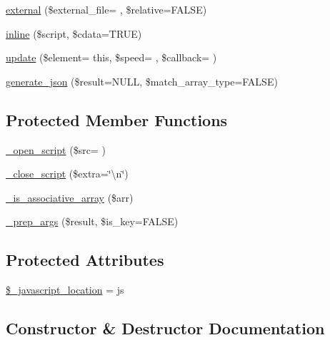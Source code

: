 \begin{DoxyCompactItemize}
\item 
\hyperlink{class_c_i___javascript_a3466ab14e2cea4f7d82050e789c2b453}{external} (\$external\+\_\+file= \textquotesingle{}\textquotesingle{}, \$relative=F\+A\+L\+S\+E)
\item 
\hyperlink{class_c_i___javascript_aeecd5d85370a4037c00dba82960816e1}{inline} (\$script, \$cdata=T\+R\+U\+E)
\item 
\hyperlink{class_c_i___javascript_af6625c6fef0852c0e89db2cef6a21d29}{update} (\$element= \textquotesingle{}this\textquotesingle{}, \$speed= \textquotesingle{}\textquotesingle{}, \$callback= \textquotesingle{}\textquotesingle{})
\item 
\hyperlink{class_c_i___javascript_ae60bb50a1e4cbbce1f6c29a73fad5e07}{generate\+\_\+json} (\$result=N\+U\+L\+L, \$match\+\_\+array\+\_\+type=F\+A\+L\+S\+E)
\end{DoxyCompactItemize}
\subsection*{Protected Member Functions}
\begin{DoxyCompactItemize}
\item 
\hyperlink{class_c_i___javascript_a85bfd18764ef4d0fdbbb3443c89c58ae}{\+\_\+open\+\_\+script} (\$src= \textquotesingle{}\textquotesingle{})
\item 
\hyperlink{class_c_i___javascript_a83a39b1edd6e0ec9bd6c93de99a0d4d8}{\+\_\+close\+\_\+script} (\$extra=\char`\"{}\textbackslash{}n\char`\"{})
\item 
\hyperlink{class_c_i___javascript_aa37c9b1b7e2898fe21a0deaace09b156}{\+\_\+is\+\_\+associative\+\_\+array} (\$arr)
\item 
\hyperlink{class_c_i___javascript_a10b9bc25e0d84b0dacb1bd7b09f3c0be}{\+\_\+prep\+\_\+args} (\$result, \$is\+\_\+key=F\+A\+L\+S\+E)
\end{DoxyCompactItemize}
\subsection*{Protected Attributes}
\begin{DoxyCompactItemize}
\item 
\hyperlink{class_c_i___javascript_a1ade0f4214435ac22074136db49cc257}{\$\+\_\+javascript\+\_\+location} = \textquotesingle{}js\textquotesingle{}
\end{DoxyCompactItemize}


\subsection{Constructor \& Destructor Documentation}
\hypertarget{class_c_i___javascript_a568ecdb0d73d2a870f33189739922a50}{}
